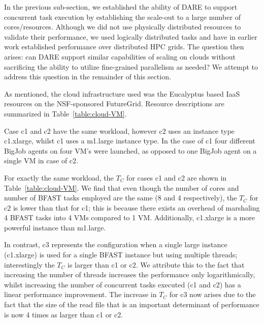 \documentclass{cpeauth}
\begin{document}
In the previous sub-section, we established the ability of DARE to
support concurrent task execution by establishing the scale-out to a
large number of cores/resources. Although we did not use physically
distributed resources to validate their performance, we used logically
distributed tasks and have in earlier work established performance
over distributed HPC grids\cite{saga-ccgrid10}.  The question then
arises: can DARE support similar capabilities of scaling on clouds
without sacrificing the ability to utilize fine-grained parallelism as
needed? We attempt to address this question in the remainder of this
section.

As mentioned, the cloud infrastructure used was the Eucalyptus based
IaaS resources on the NSF-sponsored FutureGrid\cite{futuregrid}.
Resource descriptions are summarized in Table~\ref{table:cloud-VM}.

Case c1 and c2 have the same workload, however c2 uses an instance
type c1.xlarge, whilst c1 uses a m1.large instance type.  In the case
of c1 four different BigJob agents on four VM's were launched, as
opposed to one BigJob agent on a single VM in case of c2.

For exactly the same workload, the $T_C$ for cases c1 and c2 are shown
in Table~\ref{table:cloud-VM}. We find that even though the number of
cores and number of BFAST tasks employed are the same (8 and 4
respectively), the $T_C$ for c2 is lower than that for c1; this is
because there exists an overhead of marshaling 4 BFAST tasks into 4
VMs compared to 1 VM.  Additionally, c1.xlarge is a more powerful
instance than m1.large. 

In contrast, c3 represents the configuration when a single large
instance (c1.xlarge) is used for a single BFAST instance but using
multiple threads; interestingly the $T_C$ is larger than c1 or c2.  We
attribute this to the fact that increasing the number of threads
increases the performance only logarithmically, whilst increasing the
number of concurrent tasks executed (c1 and c2) has a linear
performance improvement. The increase in $T_C$ for c3 now arises
due to the fact that the size of the read file that is
an important determinant of performance is now 4 times as larger
than c1 or c2.


\end{document}
